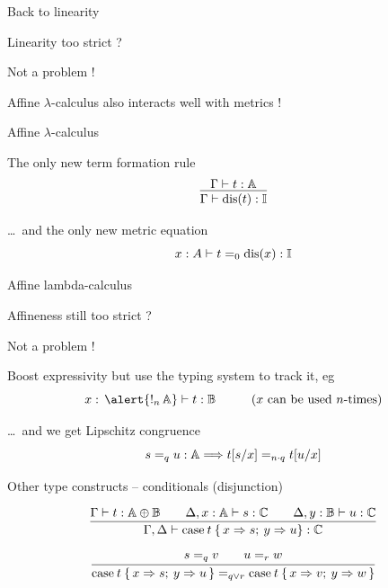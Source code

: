 \documentclass{beamer}
\begin{document}
\begin{frame}{Back to linearity}

        Linearity too strict ?

        \pause
        \medskip
        Not a problem !

        \pause
        \medskip
        \alert{Affine} $\lambda$-calculus also interacts well with 
        metrics !
\end{frame}

\begin{frame}{Affine $\lambda$-calculus}

        The only new term formation rule
        \[
                \infer{
                        \Gamma \vdash \text{dis}(t) : \typeI
                }{
                        \Gamma \vdash t : \typeA
                }
        \]

        \pause
        \medskip
        \dots\ and the only new metric equation
        \[
                x : A \vdash t =_0 \text{dis}(x) : \mathbb{I}
        \]
\end{frame}
\begin{frame}{Affine lambda-calculus}

        Affineness still too strict  ?

        \pause
        \medskip
        Not a problem !

        \pause
        \medskip
        Boost expressivity \alert{but} use the typing system to track it, eg
        \[
                x :\, \alert{ !_n \, \typeA } \vdash t : \typeB
                \hspace{1cm}
                \text{($x$ can be used $n$-times)}
        \]

        \pause
        \dots\ and we get Lipschitz congruence
        \[
                s =_q u : \mathbb{A} \Longrightarrow
                t[s/x] =_{n \cdot q} t[u/x]
        \]
\end{frame}

\begin{frame}{Other type constructs -- conditionals (disjunction)}

        \[
                \infer{
                        \Gamma, \Delta \vdash
                        \text{case} \>  t \> \{ \, x \Rightarrow s ; \> y \Rightarrow u \} 
                        : \typeC
                }{
                        \Gamma \vdash t : \typeA \oplus \typeB
                        \qquad
                        \Delta, x : \typeA \vdash s : \typeC
                        \qquad
                        \Delta, y : \typeB \vdash u : \typeC
                }
        \]

        \pause
        \bigskip
        \[
                \infer{
                        \text{case} \>  t \> \{ \, x \Rightarrow s ; \> y \Rightarrow u \, \} 
                        =_{q \vee r}
                        \text{case} \>  t \> \{ \, x \Rightarrow v ; \> y \Rightarrow w \, \} 
                }{
                        s =_q v \qquad u =_r w
                }
        \]
\end{frame}
\end{document}
